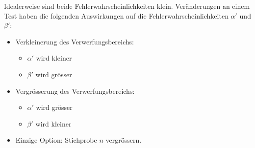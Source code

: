 Idealerweise sind beide Fehlerwahrscheinlichkeiten klein. Veränderungen an einem Test haben die folgenden Auswirkungen auf die Fehlerwahrscheinlichkeiten \(\alpha'\) und \(\beta'\):
\begin{itemize}
    \item Verkleinerung des Verwerfungsbereichs:
          \begin{itemize}
              \item \( \alpha' \) wird kleiner
              \item \( \beta' \) wird grösser
          \end{itemize}

    \item Vergrösserung des Verwerfungsbereichs:
          \begin{itemize}
              \item \( \alpha' \) wird grösser
              \item \( \beta' \) wird kleiner
          \end{itemize}

    \item Einzige Option: Stichprobe \( n \) vergrössern.
\end{itemize}

